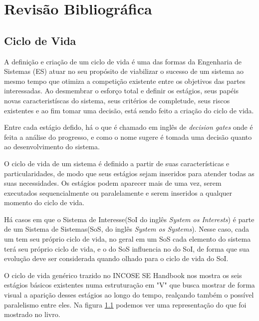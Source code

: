 
\chapter{Revisão Bibliográfica}\label{chap:revisao}

\section{Ciclo de Vida}

	A definição e criação de um ciclo de vida é uma das formas da Engenharia de Sistemas (ES) atuar no seu propósito de viabilizar o sucesso de um sistema ao
	mesmo tempo que otimiza a competição existente entre os objetivos das partes interessadas. Ao desmembrar o esforço total e definir os estágios, seus papéis novas
	caracteristíscas do sistema, seus critérios de completude, seus riscos existentes e ao fim tomar uma decisão, está sendo feito a criação do ciclo de vida.

	Entre cada estágio defido, há o que é chamado em inglês de \textit{decision gates} onde é feita a análise do progresso, e como o nome sugere é tomada uma decisão
	quanto ao desenvolvimento do sistema.

	O ciclo de vida de um sistema é definido a partir de suas características e particularidades, de modo que seus estágios sejam inseridos para atender todas as suas
	necessidades. Os estágios podem aparecer mais de uma vez, serem executados sequencialmente ou paralelamente e serem inseridos a qualquer momento do ciclo de vida.

	Há casos em que o Sistema de Interesse(SoI do inglês \textit{System os Interests}) é parte de um Sistema de Sistemas(SoS, do inglês \textit{System os Systems}). Nesse caso,
	cada um tem seu próprio ciclo de vida, no geral em um SoS cada elemento do sistema terá seu próprio ciclo de vida, e o do SoS influencia no do SoI, de forma
	que sua evolução deve ser considerada quando olhado para o ciclo de vida do SoI.

	O ciclo de vida genérico trazido no INCOSE SE Handbook nos mostra os seis estágios básicos existentes numa estruturação em "V" que busca mostrar de forma visual a aparição desses estágios
	ao longo do tempo, realçando também o possível paralelismo entre eles. Na figura \ref{} podemos ver uma representação do que foi mostrado no livro.

